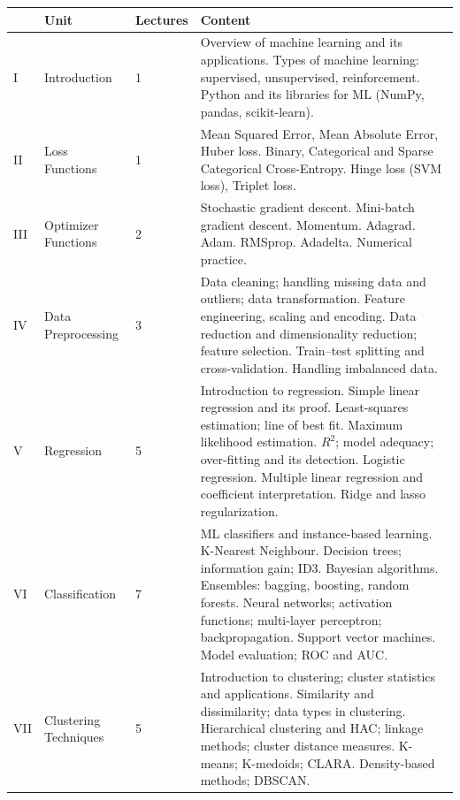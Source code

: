 \documentclass[11pt]{article}
\begin{document}
\begin{longtable}{@{}p{0.6cm}p{3.2cm}p{1.7cm}p{8.9cm}@{}}
\toprule
\textbf{} & \textbf{Unit} & \textbf{Lectures} & \textbf{Content}\\
\midrule
\endhead
I & Introduction & 1 &
Overview of machine learning and its applications. Types of machine learning:
supervised, unsupervised, reinforcement. Python and its libraries for ML
(NumPy, pandas, scikit-learn).\\[4pt]

II & Loss Functions & 1 &
Mean Squared Error, Mean Absolute Error, Huber loss. Binary, Categorical and
Sparse Categorical Cross-Entropy. Hinge loss (SVM loss), Triplet loss.\\[4pt]

III & Optimizer Functions & 2 &
Stochastic gradient descent. Mini-batch gradient descent. Momentum. Adagrad.
Adam. RMSprop. Adadelta. Numerical practice.\\[4pt]

IV & Data Preprocessing & 3 &
Data cleaning; handling missing data and outliers; data transformation. Feature
engineering, scaling and encoding. Data reduction and dimensionality reduction;
feature selection. Train--test splitting and cross-validation. Handling
imbalanced data.\\[4pt]

V & Regression & 5 &
Introduction to regression. Simple linear regression and its proof. Least-squares
estimation; line of best fit. Maximum likelihood estimation. $R^2$; model
adequacy; over-fitting and its detection. Logistic regression. Multiple linear
regression and coefficient interpretation. Ridge and lasso regularization.\\[4pt]

VI & Classification & 7 &
ML classifiers and instance-based learning. K-Nearest Neighbour. Decision trees;
information gain; ID3. Bayesian algorithms. Ensembles: bagging, boosting, random
forests. Neural networks; activation functions; multi-layer perceptron;
backpropagation. Support vector machines. Model evaluation; ROC and AUC.\\[4pt]

VII & Clustering Techniques & 5 &
Introduction to clustering; cluster statistics and applications. Similarity and
dissimilarity; data types in clustering. Hierarchical clustering and HAC;
linkage methods; cluster distance measures. K-means; K-medoids; CLARA.
Density-based methods; DBSCAN.\\
\bottomrule
\end{longtable}
\end{document}
